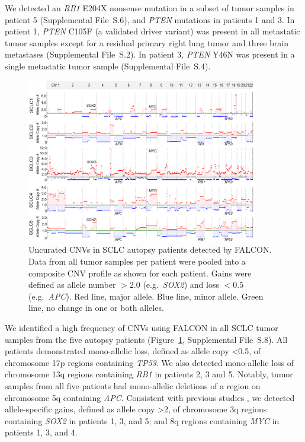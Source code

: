 We detected an \textit{RB1} E204X nonsense mutation in a subset of tumor samples in patient 5 (Supplemental File~S\thechapter{}.6), and \textit{PTEN} mutations in patients 1 and 3. In patient 1, \textit{PTEN} C105F (a validated driver variant) was present in all metastatic tumor samples except for a residual primary right lung tumor and three brain metastases (Supplemental File~S\thechapter{}.2). In patient 3, \textit{PTEN} Y46N was present in a single metastatic tumor sample (Supplemental File~S\thechapter{}.4).

\begin{figure}[htb]
    \centering
    \includegraphics[width=0.9\textwidth,keepaspectratio]{images/sclc/cnv_plots}
    \caption[CNVs in SCLC autopsy patients.]{Uncurated CNVs in SCLC autopsy patients detected by FALCON\@. Data from all tumor samples per patient were pooled into a composite CNV profile as shown for each patient. Gains were defined as allele number $> 2.0$ (e.g.\ \textit{SOX2}) and loss $< 0.5$ (e.g.\ \textit{APC}). Red line, major allele. Blue line, minor allele. Green line, no change in one or both alleles.}
    \label{fig:sclc:cnv_plots}
\end{figure}
We identified a high frequency of CNVs using FALCON \cite{falcon} in all SCLC tumor samples from the five autopsy patients (Figure~\ref{fig:sclc:cnv_plots}, Supplemental File~S\thechapter{}.8). All patients demonstrated mono-allelic loss, defined as allele copy \textless{}0.5, of chromosome 17p regions containing \textit{TP53}. We also detected mono-allelic loss of chromosome 13q regions containing \textit{RB1} in patients 2, 3 and 5. Notably, tumor samples from all five patients had mono-allelic deletions of a region on chromosome 5q containing \textit{APC}. Consistent with previous studies \cite{rudin2012}, we detected allele-specific gains, defined as allele copy \textgreater{}2, of chromosome 3q regions containing \textit{SOX2} in patients 1, 3, and 5; and 8q regions containing \textit{MYC} in patients 1, 3, and 4. 

